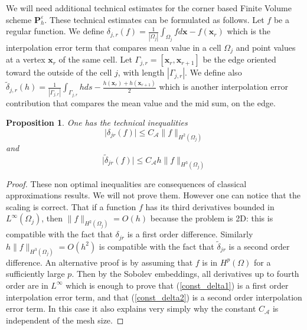 \documentclass[a4paper,french,english,10pt]{article}
\newcommand\eps{\varepsilon}
\newcommand\x{\mathbf{x}}
\newtheorem{pro}[theorem]{Proposition}
\begin{document}
We will need additional technical estimates for the corner based Finite Volume scheme $\mathbf P_h^\eps$. 
These technical estimates can be formulated as follows.
Let  $f$ be a regular function. We define
$\delta_{j,r}(f)= \frac{1}{|\Omega_j|}\int_{\Omega_j} f d\x
-f(\x_{r})$ which is the  interpolation error term that compares mean value in a cell $\Omega_j$  and point 
values at a vertex $\mathbf x_r$ of the same cell.
Let $\Gamma_{j,r}=[\x_{r},\x_{r+1}]$ be the edge
oriented toward the outside of the cell $j$, with
length $|\Gamma_{j,r} | $. We define also $\tilde{\delta}_{j,r}(h)=
\frac1{|\Gamma_{j,r}| } \int_{\Gamma_{j,r}} h d s
-\frac{h(\textbf{x}_{r})+h(\textbf{x}_{r+1})}{2}$ which is another
interpolation error contribution that compares the  mean value and the mid sum,
on the edge.





\begin{pro} \label{pro:interp}
One has the technical  inequalities
\begin{equation}\label{const_delta1}
 \vert \delta_{jr}(f) \vert
 \leq 
  C_{\mathcal A}  \| f \| _{ H^2(\Omega_j) }
\end{equation}
and
\begin{equation}\label{const_delta2}
\vert \widetilde \delta_{jr}(f)\vert
\leq  
  C_{\mathcal A} h  \| f \| _{ H^3(\Omega_j) }
\end{equation}
\end{pro}
\begin{proof}
These non optimal inequalities are consequences  of classical approximations results.
We will not prove them. However one can notice that the scaling is correct. %
That if a  function $f$ has its third derivatives bounded in $L^\infty(\Omega_j)$,
then $ \| f \| _{ H^2(\Omega_j) } =O(h)$ because the problem is 2D: this is compatible with
the fact that $\delta_{jr}$ is a first order difference.
Similarly $h \| f \| _{ H^3(\Omega_j) } =O(h^2)$ is compatible with the fact that 
$ \widetilde \delta_{jr}$ is a second order difference.
An alternative proof is by assuming that $f$ is in $H^p(\Omega)$ for a sufficiently large $p$.
Then by the Sobolev embeddings, all derivatives up to fourth order are in $L^\infty$ which is enough
to prove that (\ref{const_delta1}) is a first order interpolation error term, and that
(\ref{const_delta2}) is a second order interpolation error term.
In this case it also explains very simply
why the constant $C_\mathcal A$ is independent of the mesh size. 
\end{proof}
\end{document}
